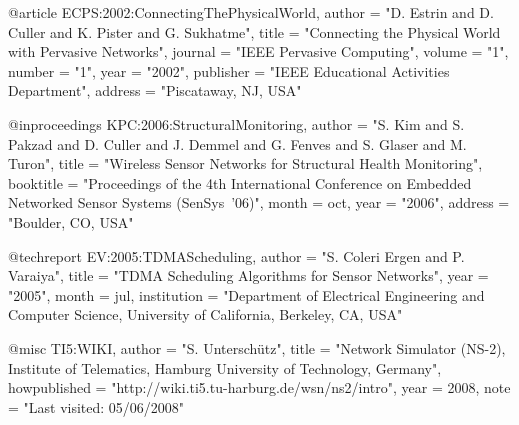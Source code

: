 \begin{tuhhlisting}[label=lst:sampleBibtex,language=TeX,caption={BibTeX examples},{morekeywords={@article,@inproceedings,@techreport,@misc}},{morestring=[b]"}]
@article{ ECPS:2002:ConnectingThePhysicalWorld,
	author       = "D. Estrin and D. Culler and K. Pister and G. Sukhatme",
	title        = "{Connecting the Physical World with Pervasive Networks}",
	journal      = "IEEE Pervasive Computing",
	volume       = "1",
	number       = "1",
	year         = "2002",
	publisher    = "IEEE Educational Activities Department",
	address      = "Piscataway, NJ, USA"
}

@inproceedings{ KPC:2006:StructuralMonitoring,
	author       = "S. Kim and S. Pakzad and D. Culler and J. Demmel and G. Fenves and S. Glaser and M. Turon",
	title        = "{Wireless Sensor Networks for Structural Health Monitoring}",
	booktitle    = "Proceedings of the 4th International Conference on Embedded Networked Sensor Systems (SenSys~'06)",
	month        = oct,
	year         = "2006",
	address      = "Boulder, CO, USA"
}

@techreport{ EV:2005:TDMAScheduling,
	author       = "S. Coleri Ergen and P. Varaiya",
	title        = "{TDMA Scheduling Algorithms for Sensor Networks}",
	year         = "2005",
	month        = jul,
	institution  = "Department of Electrical Engineering and Computer Science, University of California, Berkeley, CA, USA"
}

@misc{ TI5:WIKI,
	author       = "S. Untersch{\"u}tz",
	title        = "{Network Simulator (NS-2), Institute of Telematics, Hamburg University of Technology, Germany}",
	howpublished = "http://wiki.ti5.tu-harburg.de/wsn/ns2/intro",
	year         = 2008,
	note         = "Last visited: 05/06/2008"
}
\end{tuhhlisting}
